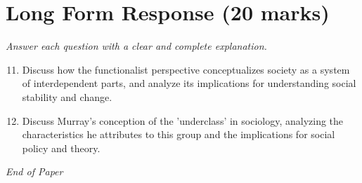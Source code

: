 \documentclass[12pt]{article}
\begin{document}
\section*{Long Form Response (20 marks)}
\textit{Answer each question with a clear and complete explanation.}
\begin{enumerate}[label=\arabic*.]
\setcounter{enumi}{10}
\item Discuss how the functionalist perspective conceptualizes society as a system of interdependent parts, and analyze its implications for understanding social stability and change.
\item Discuss Murray's conception of the 'underclass' in sociology, analyzing the characteristics he attributes to this group and the implications for social policy and theory.
\end{enumerate}

\vfill
\noindent\textit{End of Paper}
\end{document}
